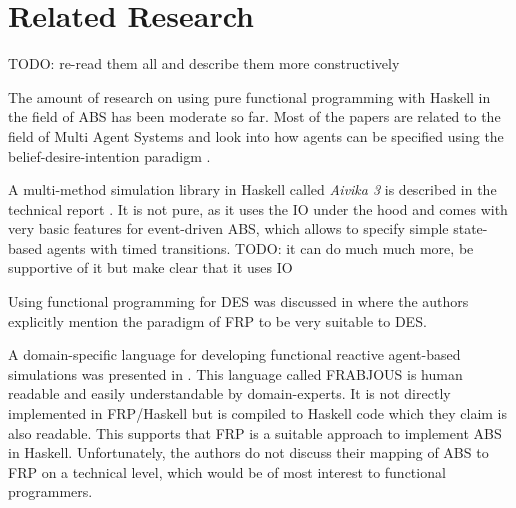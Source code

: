 \section{Related Research}
TODO: re-read them all and describe them more constructively

The amount of research on using pure functional programming with Haskell in the field of ABS has been moderate so far. Most of the papers are related to the field of Multi Agent Systems and look into how agents can be specified using the belief-desire-intention paradigm \cite{de_jong_suitability_2014, sulzmann_specifying_2007, jankovic_functional_2007}.

A multi-method simulation library in Haskell called \textit{Aivika 3} is described in the technical report \cite{sorokin_aivika_2015}. It is not pure, as it uses the IO under the hood and comes with very basic features for event-driven ABS, which allows to specify simple state-based agents with timed transitions. TODO: it can do much much more, be supportive of it but make clear that it uses IO 

Using functional programming for DES was discussed in \cite{jankovic_functional_2007} where the authors explicitly mention the paradigm of FRP to be very suitable to DES.

A domain-specific language for developing functional reactive agent-based simulations was presented in \cite{vendrov_frabjous:_2014}. This language called FRABJOUS is human readable and easily understandable by domain-experts. It is not directly implemented in FRP/Haskell but is compiled to Haskell code which they claim is also readable. This supports that FRP is a suitable approach to implement ABS in Haskell. Unfortunately, the authors do not discuss their mapping of ABS to FRP on a technical level, which would be of most interest to functional programmers.


